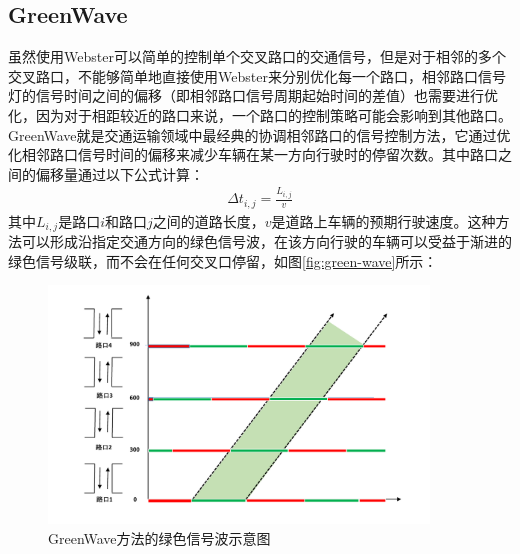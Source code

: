 \subsection{GreenWave}
虽然使用Webster可以简单的控制单个交叉路口的交通信号，但是对于相邻的多个交叉路口，不能够简单地直接使用Webster来分别优化每一个路口，相邻路口信号灯的信号时间之间的偏移（即相邻路口信号周期起始时间的差值）也需要进行优化，因为对于相距较近的路口来说，一个路口的控制策略可能会影响到其他路口。
GreenWave\cite{roess2004traffic}就是交通运输领域中最经典的协调相邻路口的信号控制方法，它通过优化相邻路口信号时间的偏移来减少车辆在某一方向行驶时的停留次数。其中路口之间的偏移量通过以下公式计算：
\begin{align}
    \label{eq:green-wave}
    \Delta t_{i, j}=\frac{L_{i, j}}{v}
\end{align}
其中$L_{i, j}$是路口$i$和路口$j$之间的道路长度，$v$是道路上车辆的预期行驶速度。这种方法可以形成沿指定交通方向的绿色信号波，在该方向行驶的车辆可以受益于渐进的绿色信号级联，而不会在任何交叉口停留，如图\autoref{fig:green-wave}所示：
\begin{figure}[htb]
    \includegraphics[width=0.9\textwidth]{fig/green-wave.pdf}
    \caption{GreenWave方法的绿色信号波示意图}
    \label{fig:green-wave}
\end{figure}


